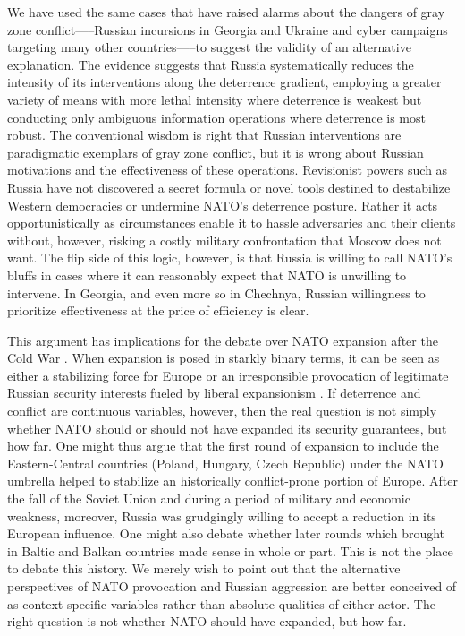 \documentclass[bibtex, autowc]{apsr_submission}
\begin{document}
We have used the same cases that have raised alarms about the dangers of gray zone conflict—--Russian incursions in Georgia and Ukraine and cyber campaigns targeting many other countries—--to suggest the validity of an alternative explanation. The evidence suggests that Russia systematically reduces the intensity of its interventions along the deterrence gradient, employing a greater variety of means with more lethal intensity where deterrence is weakest but conducting only ambiguous information operations where deterrence is most robust. The conventional wisdom is right that Russian interventions are paradigmatic exemplars of gray zone conflict, but it is wrong about Russian motivations and the effectiveness of these operations. Revisionist powers such as Russia have not discovered a secret formula or novel tools destined to destabilize Western democracies or undermine NATO's deterrence posture. Rather it acts opportunistically as circumstances enable it to hassle adversaries and their clients without, however, risking a costly military confrontation that Moscow does not want. The flip side of this logic, however, is that Russia is willing to call NATO’s bluffs in cases where it can reasonably expect that NATO is unwilling to intervene. In Georgia, and even more so in Chechnya, Russian willingness to prioritize effectiveness at the price of efficiency is clear.

This argument has implications for the debate over NATO expansion after the Cold War \citep{shifrinson_dealnodeal_2016}. When expansion is posed in starkly binary terms, it can be seen as either a stabilizing force for Europe or an irresponsible provocation of legitimate Russian security interests fueled by liberal expansionism \citep{mcfaul_faultypowers_2014, mearsheimer_whyukrainecrisis_2014}. If deterrence and conflict are continuous variables, however, then the real question is not simply whether NATO should or should not have expanded its security guarantees, but how far. One might thus argue that the first round of expansion to include the Eastern-Central countries (Poland, Hungary, Czech Republic) under the NATO umbrella helped to stabilize an historically conflict-prone portion of Europe. After the fall of the Soviet Union and during a period of military and economic weakness, moreover, Russia was grudgingly willing to accept a reduction in its European influence. One might also debate whether later rounds which brought in Baltic and Balkan countries made sense in whole or part. This is not the place to debate this history. We merely wish to point out that the alternative perspectives of NATO provocation and Russian aggression are better conceived of as context specific variables rather than absolute qualities of either actor. The right question is not whether NATO should have expanded, but how far.
\end{document}
